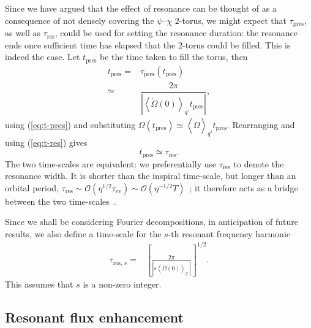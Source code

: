 \documentclass[aps,prd,amsfonts,amssymb,amsmath,nofootinbib,showpacs,superscriptaddress,twocolumn]{revtex4}
\newcommand{\eqnref}[1]{(\ref{eq:#1})}
\newcommand{\sub}[1]{\ensuremath{_\text{#1}}}
\newcommand{\order}[1]{\ensuremath{\mathcal{O}({#1})}}
\begin{document}
Since we have argued that the effect of resonance can be thought of as a consequence of not densely covering the $\psi$--$\chi$ $2$-torus, we might expect that $\tau\sub{pres}$, as well as $\tau\sub{res}$, could be used for setting the resonance duration: the resonance ends once sufficient time has elapsed that the $2$-torus could be filled. This is indeed the case. Let $t\sub{pres}$ be the time taken to fill the torus, then
\begin{align}
t\sub{pres} = {} & \tau\sub{pres}(t\sub{pres}) \\
 \simeq {} & \dfrac{2\pi}{\left|\left\langle\dot{\Omega}(0)\right\rangle_{q'} t\sub{pres}\right|}, \nonumber 
\end{align}
using \eqnref{t-pres} and substituting $\Omega(t\sub{pres}) \simeq \left\langle\dot{\Omega}\right\rangle_{q'} t\sub{pres}$. Rearranging and using \eqnref{t-res} gives
\begin{equation}
t\sub{pres} \simeq \tau\sub{res}.
\end{equation}
The two time-scales are equivalent: we preferentially use $\tau\sub{res}$ to denote the resonance width. It is shorter than the inspiral time-scale, but longer than an orbital period, $\tau\sub{res} \sim \order{\eta^{1/2}\tau\sub{ev}} \sim \order{\eta^{-1/2}T}$~\cite{Flanagan2012,Gair2011a}; it therefore acts as a bridge between the two time-scales~\cite{Hinderer2008}.

Since we shall be considering Fourier decompositions, in anticipation of future results, we also define a time-scale for the $s$-th resonant frequency harmonic
\begin{align}
\tau_{\mathrm{res},\,s} = {} & \left[\frac{2\pi}{\left|s\left\langle \dot{\Omega}(0)\right\rangle_{q'}\right|}\right]^{1/2}.
\label{eq:T-res-s}
\end{align}
This assumes that $s$ is a non-zero integer.

\subsection{Resonant flux enhancement}\label{sec:flux-enhance}
\end{document}
